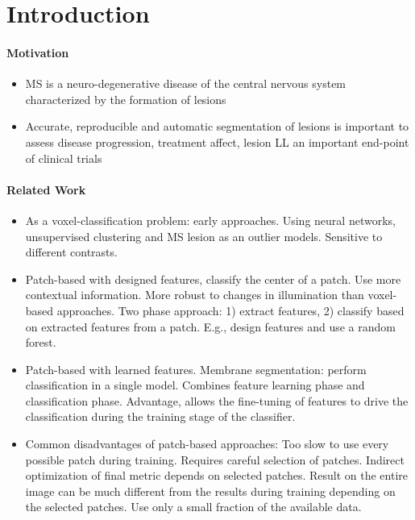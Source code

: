 \section{Introduction}

\paragraph{Motivation}
\begin{itemize}
  \item MS is a neuro-degenerative disease of the central nervous system
  characterized by the formation of lesions
  \item Accurate, reproducible and automatic segmentation of
  lesions is important to assess disease progression, treatment affect, lesion
  LL an important end-point of clinical trials
\end{itemize}

\paragraph{Related Work}

\begin{itemize}
  
\item As a voxel-classification problem: early approaches. Using neural
networks, unsupervised clustering and MS lesion as an outlier models.
Sensitive to different contrasts.

\item Patch-based with designed features, classify the center of a patch. Use
more contextual information. More robust to changes in illumination than
voxel-based approaches. Two phase approach: 1) extract features, 2) classify
based on extracted features from a patch. E.g., design features and use a random
forest.

\item Patch-based with learned features. Membrane segmentation: perform
classification in a single model. Combines feature learning phase and
classification phase. Advantage, allows the fine-tuning of features to drive the
classification during the training stage of the classifier.

\item Common disadvantages of patch-based approaches: Too slow to use every
possible patch during training. Requires careful selection of patches. Indirect
optimization of final metric depends on selected patches. Result on the entire
image can be much different from the results during training depending on the
selected patches. Use only a small fraction of the available data.

\end{itemize}

